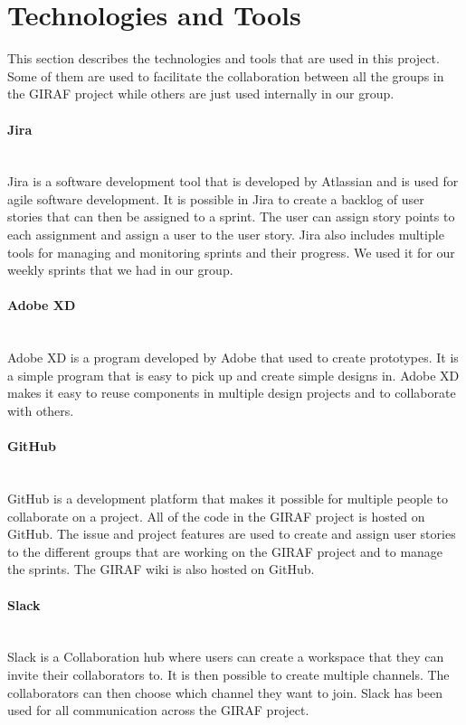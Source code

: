\section{Technologies and Tools}
This section describes the technologies and tools that are used in this project. 
Some of them are used to facilitate the collaboration between all the groups in the GIRAF project while others are just used internally in our group.

\paragraph{Jira}~\\
Jira is a software development tool that is developed by Atlassian and is used for agile software development.
It is possible in Jira to create a backlog of user stories that can then be assigned to a sprint. The user can assign story points to each assignment and assign a user to the user story.
Jira also includes multiple tools for managing and monitoring sprints and their progress.
We used it for our weekly sprints that we had in our group.

\paragraph{Adobe XD}~\\
Adobe XD is a program developed by Adobe that used to create prototypes.
It is a simple program that is easy to pick up and create simple designs in.
Adobe XD makes it easy to reuse components in multiple design projects and to collaborate with others.

\paragraph{GitHub}~\\
GitHub is a development platform that makes it possible for multiple people to collaborate on a project. 
All of the code in the GIRAF project is hosted on GitHub.
The issue and project features are used to create and assign user stories to the different groups that are working on the GIRAF project and to manage the sprints. 
The GIRAF wiki is also hosted on GitHub.

\paragraph{Slack}~\\
Slack is a Collaboration hub where users can create a workspace that they can invite their collaborators to.
It is then possible to create multiple channels. The collaborators can then choose which channel they want to join.
Slack has been used for all communication across the GIRAF project.
